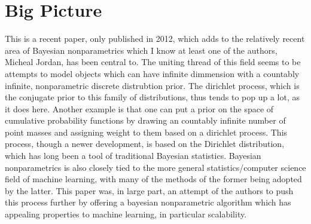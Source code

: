 \documentclass[11pt]{article}
\theoremstyle{definition}
\begin{document}
\section{Big Picture}
This is a recent paper, only published in 2012, which adds to the relatively recent area of Bayesian nonparametrics which I know at least one of the authors, Micheal Jordan, has been central to. The uniting thread of this field seems to be attempts to model objects which can have infinite dimmension with a countably infinite, nonparametric discrete distrubtion prior. The dirichlet process, which is the conjugate prior to this family of distributions, thus tends to pop up a lot, as it does here. Another example is that one can put a prior on the space of cumulative probability functions by drawing an countably infinite number of point masses and assigning weight to them based on a dirichlet process. This process, though a newer development, is based on the Dirichlet distribution, which has long been a tool of traditional Bayesian statistics. Bayesian nonparametrics is also closely tied to the more general statistics/computer science field of machine learning, with many of the methods of the former being adopted by the latter. This paper was, in large part, an attempt of the authors to push this process further by offering a bayesian nonparametric algorithm which has appealing properties to machine learning, in particular scalability.
\end{document}
